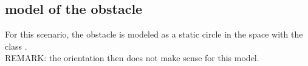 \subsection{model of the obstacle}

For this scenario, the obstacle is modeled as a static circle in the space with the class .\\
{\color{red}REMARK: the orientation then does not make sense for this model.}



